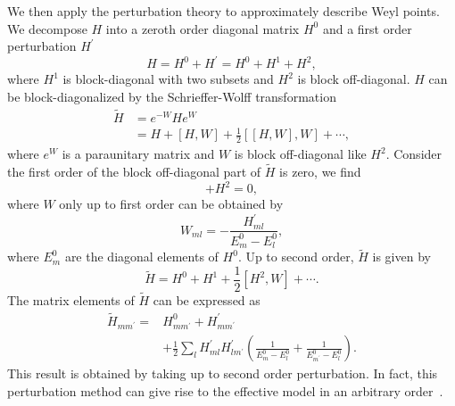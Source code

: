 \documentclass[aps,pra,floatfix,twocolumn,superscriptaddress]{revtex4-1}
\begin{document}
We then apply the perturbation theory to approximately describe Weyl points. We decompose $H$ into a zeroth order diagonal matrix $H^0$ and a first order perturbation $H^\prime$
\begin{equation}
	H=H^0+H^\prime=H^0+H^1+H^2,
\end{equation}
where $H^1$ is block-diagonal with two subsets and $H^2$ is block off-diagonal. $H$ can be block-diagonalized by the Schrieffer-Wolff transformation
\begin{equation}
	\begin{aligned}
		\tilde{H}&=e^{-W}He^{W}\\
		&=H+[H,W]+\frac{1}{2}[[H,W],W]+\cdots,
	\end{aligned}
\end{equation}
where $e^W$ is a paraunitary matrix and $W$ is block off-diagonal like $H^2$. Consider the first order of the block off-diagonal part of $\tilde{H}$ is zero, we find
\begin{equation}
	[H^0,W]+H^2=0,
\end{equation}
where $W$ only up to first order can be obtained by
\begin{equation}
	W_{ml}=-\frac{H_{ml}^\prime}{E_{m}^0-E_{l}^0},
	\label{EqW}
\end{equation}
where $E_{m}^0$ are the diagonal elements of $H^0$. Up to second order, $\tilde{H}$ is given by
\begin{equation}
	\tilde{H}=H^0+H^1+\frac{1}{2}[H^2,W]+\cdots.
\end{equation}
The matrix elements of $\tilde{H}$ can be expressed as
\begin{equation}
\begin{aligned}
\tilde{H}_{mm^\prime}=&H_{mm^{\prime}}^0+H_{mm^{\prime}}^\prime\\
&+\frac{1}{2}\sum_{l}H_{ml}^\prime H_{lm^{\prime}}^\prime \left(\frac{1}{E_{m}^0-E_{l}^0}+\frac{1}{E_{m^{\prime}}^0-E_{l}^0}\right).
\end{aligned}
\label{Eq2rd}
\end{equation}
This result is obtained by taking up to second order perturbation. In fact, this perturbation method can give rise to the effective model in an arbitrary order~\cite{PhysRevB.106.144434}.
\end{document}
